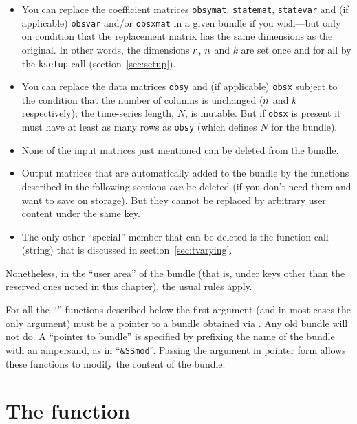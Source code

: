 \begin{itemize}
\item You can replace the coefficient matrices \texttt{obsymat},
  \texttt{statemat}, \texttt{statevar} and (if applicable)
  \texttt{obsvar} and/or \texttt{obsxmat} in a given bundle if you
  wish---but only on condition that the replacement matrix has the
  same dimensions as the original. In other words, the dimensions
  $r$, $n$ and $k$ are set once and for all by the
  \texttt{ksetup} call (section~\ref{sec:setup}).
\item You can replace the data matrices \texttt{obsy} and (if
  applicable) \texttt{obsx} subject to the condition that the number
  of columns is unchanged ($n$ and $k$ respectively); the time-series
  length, $N$, is mutable. But if \texttt{obsx} is present it must
  have at least as many rows as \texttt{obsy} (which defines $N$ for
  the bundle).
\item None of the input matrices just mentioned can be deleted from
  the bundle.
\item Output matrices that are automatically added to the bundle by
  the functions described in the following sections \textit{can} be
  deleted (if you don't need them and want to save on storage). But
  they cannot be replaced by arbitrary user content under the same
  key.
\item The only other ``special'' member that can be deleted is the
  function call (string) that is discussed in
  section~\ref{sec:tvarying}.
\end{itemize}

Nonetheless, in the ``user area'' of the bundle (that is, under keys
other than the reserved ones noted in this chapter), the usual rules
apply.

For all the ``'' functions described below the first argument
(and in most cases the only argument) must be a pointer to a bundle
obtained via . Any old bundle will not do. A ``pointer to
bundle'' is specified by prefixing the name of the bundle with an
ampersand, as in ``\verb|&SSmod|''. Passing the argument in pointer
form allows these functions to modify the content of the bundle.

\section{The  function}
\label{sec:kfilter}

